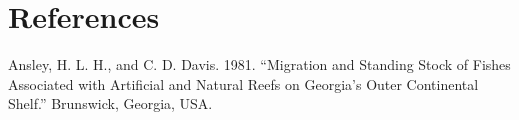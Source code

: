\documentclass[
  letterpaper,
  oneside,
  open=any]{scrbook}
\newlength{\cslhangindent}
\newlength{\cslentryspacingunit} %
\newenvironment{CSLReferences}[2] %
 {%
  \setlength{\parindent}{0pt}
  \ifodd #1
  \let\oldpar\par
  \def\par{\hangindent=\cslhangindent\oldpar}
  \fi
  \setlength{\parskip}{#2\cslentryspacingunit}
 }%
 {}
\begin{document}

\hypertarget{references-1}{%
\chapter*{References}\label{references-1}}


\hypertarget{refs}{}
\begin{CSLReferences}{1}{0}
\leavevmode{}%
Ansley, H. L. H., and C. D. Davis. 1981. {``Migration and Standing Stock
of Fishes Associated with Artificial and Natural Reefs on Georgia{'}s
Outer Continental Shelf.''} Brunswick, Georgia, USA.

\end{CSLReferences}


\backmatter
\end{document}
